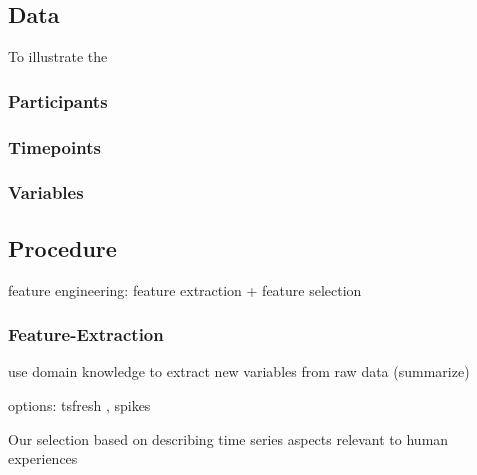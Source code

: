 \subsection{Data}

To illustrate the

\subsubsection{Participants}

\subsubsection{Timepoints}

\subsubsection{Variables}

\subsection{Procedure}

feature engineering: feature extraction + feature selection

\subsubsection{Feature-Extraction}

use domain knowledge to extract new variables from raw data (summarize)

options: tsfresh \citep[][]{christ2018}, spikes
\citep[][]{caro-martin2018}

Our selection based on describing time series aspects relevant to human
experiences
\citep[density, inertia, instability, diversity;][]{dejonckheere2019, kuppens2017}

